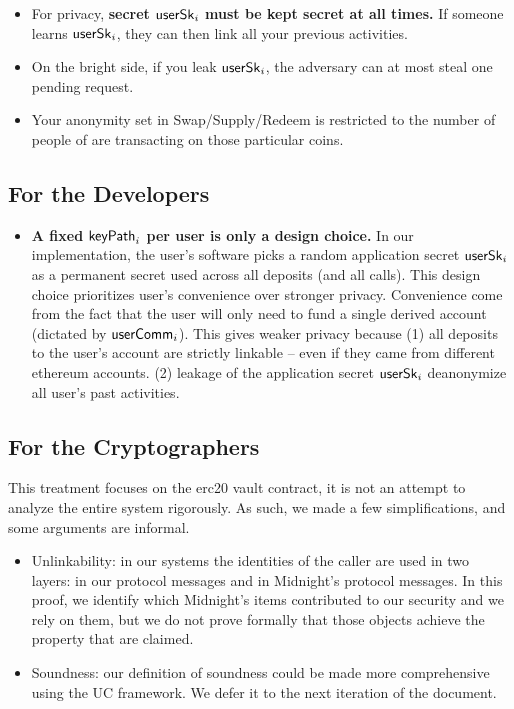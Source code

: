 \begin{itemize}
\item For privacy,  \textbf{secret $\mathsf{userSk}_i$  must be kept secret at all times.}
If someone learns $\mathsf{userSk}_i$, they can then link all your previous activities.

\item On the bright side, if you leak $\mathsf{userSk}_i$,
the adversary can at most steal one pending request.



\item Your anonymity set  in Swap/Supply/Redeem is restricted to  the number of people of are transacting  on those particular coins.

\end{itemize}





\subsection{For the Developers}

\begin{itemize}
    \item \textbf{A fixed $\mathsf{keyPath}_i$ per user is only a design choice.} In our implementation,  the user's software picks a random application secret $\mathsf{userSk}_i$ as a permanent secret used across all deposits (and all calls). This design choice prioritizes user's convenience over stronger privacy. Convenience come from the fact that the user will only need to fund a single derived account (dictated by  $\mathsf{userComm}_i$).
    This gives weaker privacy  because (1) all deposits to the user's account are strictly linkable  -- even if they came from different ethereum accounts.  (2) leakage of the application secret $\mathsf{userSk}_i$ deanonymize all user's past activities.
\end{itemize}

\subsection{For the Cryptographers}

This treatment focuses on the erc20 vault contract,  it is not an attempt to analyze the entire system rigorously.
As such, we made a few simplifications, and some arguments are  informal.


\begin{itemize}
    \item Unlinkability: in our systems the identities  of the caller are used in two layers: in our protocol messages and in Midnight's protocol messages.
    In this proof, we identify which Midnight's items contributed to our security and we rely on them, but we do not prove formally that those objects achieve the property that are claimed.


    \item Soundness: our definition of soundness could be  made more comprehensive using the UC framework. We defer it to the next iteration of the document.


\end{itemize}
